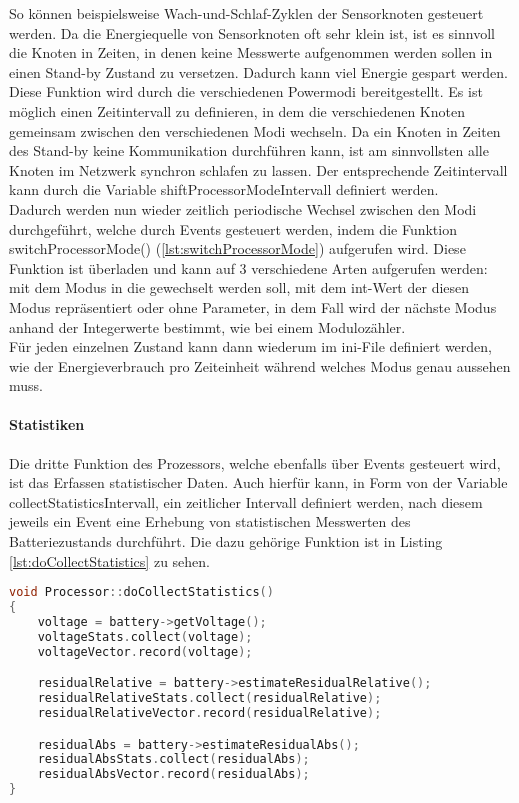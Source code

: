 So können beispielsweise Wach-und-Schlaf-Zyklen der Sensorknoten gesteuert werden. Da die Energiequelle von Sensorknoten oft sehr klein ist, ist es sinnvoll die Knoten in Zeiten, in denen keine Messwerte aufgenommen werden sollen in einen Stand-by Zustand zu versetzen. Dadurch kann viel Energie gespart werden.\\
Diese Funktion wird durch die verschiedenen Powermodi bereitgestellt. Es ist möglich einen Zeitintervall zu definieren, in dem die verschiedenen Knoten gemeinsam zwischen den verschiedenen Modi wechseln. Da ein Knoten in Zeiten des Stand-by keine Kommunikation durchführen kann, ist am sinnvollsten alle Knoten im Netzwerk synchron schlafen zu lassen. Der entsprechende Zeitintervall kann durch die Variable shiftProcessorModeIntervall definiert werden.\\
Dadurch werden nun wieder zeitlich periodische Wechsel zwischen den Modi durchgeführt, welche durch Events gesteuert werden, indem die Funktion switchProcessorMode() (\ref{lst:switchProcessorMode}) aufgerufen wird. Diese Funktion ist überladen und kann auf 3 verschiedene Arten aufgerufen werden: mit dem Modus in die gewechselt werden soll, mit dem int-Wert der diesen Modus repräsentiert oder ohne Parameter, in dem Fall wird der nächste Modus anhand der Integerwerte bestimmt, wie bei einem Modulozähler.\\
Für jeden einzelnen Zustand kann dann wiederum im ini-File definiert werden, wie der Energieverbrauch pro Zeiteinheit während welches Modus genau aussehen muss.

\paragraph{Statistiken}

Die dritte Funktion des Prozessors, welche ebenfalls über Events gesteuert wird, ist das Erfassen statistischer Daten. Auch hierfür kann, in Form von der Variable collectStatisticsIntervall, ein zeitlicher Intervall definiert werden, nach diesem jeweils ein Event eine Erhebung von statistischen Messwerten des Batteriezustands durchführt. Die dazu gehörige Funktion ist in Listing \ref{lst:doCollectStatistics} zu sehen.

\begin{lstlisting}[language=C++, label=lst:doCollectStatistics, caption=doCollectStatistics()]
void Processor::doCollectStatistics()
{
    voltage = battery->getVoltage();
    voltageStats.collect(voltage);
    voltageVector.record(voltage);

    residualRelative = battery->estimateResidualRelative();
    residualRelativeStats.collect(residualRelative);
    residualRelativeVector.record(residualRelative);

    residualAbs = battery->estimateResidualAbs();
    residualAbsStats.collect(residualAbs);
    residualAbsVector.record(residualAbs);
}
\end{lstlisting}

